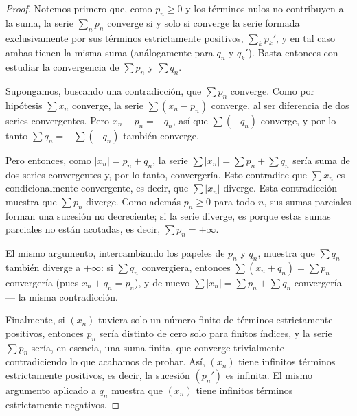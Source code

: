 \documentclass[12pt,a4paper]{article}
\begin{document}
    \begin{proof}
        Notemos primero que, como $p_n\ge0$ y los términos nulos no contribuyen a la suma, la serie
        $\sum_n p_n$ converge si y solo si converge la serie formada exclusivamente por sus términos
        estrictamente positivos, $\sum_k p_k'$, y en tal caso ambas tienen la misma suma
        (análogamente para $q_n$ y $q_k'$). Basta entonces con estudiar la convergencia de
        $\sum p_n$ y $\sum q_n$.

        Supongamos, buscando una contradicción, que $\sum p_n$ converge. Como por hipótesis
        $\sum x_n$ converge, la serie $\sum(x_n-p_n)$ converge, al ser diferencia de dos series
        convergentes. Pero $x_n-p_n=-q_n$, así que $\sum(-q_n)$ converge, y por lo tanto
        $\sum q_n=-\sum(-q_n)$ también converge.

        Pero entonces, como $|x_n|=p_n+q_n$, la serie $\sum|x_n|=\sum p_n+\sum q_n$ sería suma de
        dos series convergentes y, por lo tanto, convergería. Esto contradice que $\sum x_n$ es
        condicionalmente convergente, es decir, que $\sum|x_n|$ diverge. Esta contradicción muestra
        que $\sum p_n$ diverge. Como además $p_n\ge0$ para todo $n$, sus sumas parciales forman una
        sucesión no decreciente; si la serie diverge, es porque estas sumas parciales no están
        acotadas, es decir, $\sum p_n=+\infty$.

        El mismo argumento, intercambiando los papeles de $p_n$ y $q_n$, muestra que $\sum q_n$
        también diverge a $+\infty$: si $\sum q_n$ convergiera, entonces $\sum(x_n+q_n)=\sum p_n$
        convergería (pues $x_n+q_n=p_n$), y de nuevo $\sum|x_n|=\sum p_n+\sum q_n$ convergería —
        la misma contradicción.

        Finalmente, si $(x_n)$ tuviera solo un número finito de términos estrictamente positivos,
        entonces $p_n$ sería distinto de cero solo para finitos índices, y la serie $\sum p_n$ sería,
        en esencia, una suma finita, que converge trivialmente — contradiciendo lo que acabamos de
        probar. Así, $(x_n)$ tiene infinitos términos estrictamente positivos, es decir, la sucesión
        $(p_n')$ es infinita. El mismo argumento aplicado a $q_n$ muestra que $(x_n)$ tiene infinitos
        términos estrictamente negativos.
    \end{proof}
\end{document}
